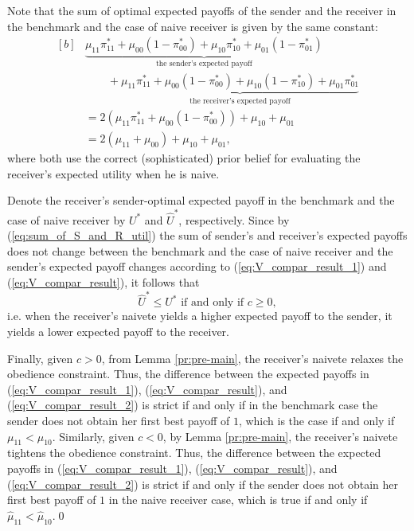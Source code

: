 \documentclass[12pt,english]{article}
\theoremstyle{plain}
\begin{document}
\begin{appendices}
Note that the sum of optimal expected payoffs of the sender and the receiver in the benchmark and  the case of naive receiver is given by the same constant: 
\begin{equation}
\begin{aligned}[b]
&\underbrace{\mu_{11}\pi_{11}^{*} + \mu_{00}(1-\pi_{00}^{*}) + \mu_{10}\pi_{10}^{*} + \mu_{01}(1-\pi_{01}^{*})}_{\text{the sender's expected payoff}} \\
&\quad\quad + \underbrace{\mu_{11}\pi_{11}^{*} + \mu_{00}(1-\pi_{00}^{*}) + \mu_{10}\left(1-\pi_{10}^{*}\right) + \mu_{01}\pi_{01}^{*}}_\text{the receiver's expected payoff} \\
&= 2\left(\mu_{11}\pi_{11}^{*} + \mu_{00}(1-\pi_{00}^{*})\right) + \mu_{10} + \mu_{01} \\
&= 2\left(\mu_{11} + \mu_{00}\right) + \mu_{10} + \mu_{01},
\end{aligned} \label{eq:sum_of_S_and_R_util}
\end{equation}
where both use the correct (sophisticated) prior belief for evaluating the receiver's expected utility when he is naive.   

Denote the receiver's sender-optimal expected payoff in the benchmark and the case of naive receiver by $U^*$ and $\hat{U}^{*}$, respectively. 
Since by (\ref{eq:sum_of_S_and_R_util}) the sum of sender's and receiver's expected payoffs does not change between the benchmark and the case of naive receiver and the sender's expected payoff changes according to (\ref{eq:V_compar_result_1}) and (\ref{eq:V_compar_result}), it follows that
\begin{equation}
\hat{U}^{*}\leq U^{*} \text{ if and only if } c\geq0,
\label{eq:V_compar_result_2}
\end{equation}
i.e. when the receiver's naivete yields a higher expected payoff to  the sender, it yields a lower expected payoff to the receiver.  

Finally, given $c>0$, from Lemma \ref{pr:pre-main}, the receiver's naivete relaxes the obedience constraint. 
Thus, the difference between the expected payoffs in (\ref{eq:V_compar_result_1}), (\ref{eq:V_compar_result}), and (\ref{eq:V_compar_result_2}) is strict if and only if in the benchmark case the sender does not obtain her first best payoff of $1$, which is the case if and only if $\mu_{11}<\mu_{10}$. 
Similarly, given $c<0$, by Lemma \ref{pr:pre-main}, the receiver's naivete tightens the obedience constraint. 
Thus, the difference between the expected payoffs in (\ref{eq:V_compar_result_1}), (\ref{eq:V_compar_result}), and (\ref{eq:V_compar_result_2}) is strict if and only if the sender does not obtain her first best payoff of $1$ in the naive receiver case, which is true if and only if $\hat{\mu}_{11}<\hat{\mu}_{10}$.\qed \\

\end{appendices}




\end{document}

